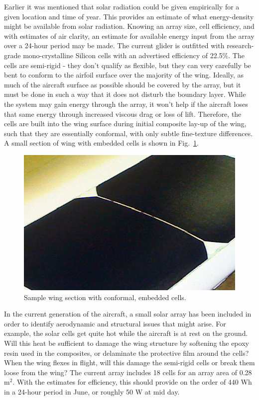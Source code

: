 \documentclass{ifacconf}
\begin{document}
Earlier it was mentioned that solar radiation could be given empirically for a given location and time of year. This provides an estimate of what energy-density might be available from solar radiation. Knowing an array size, cell efficiency, and with estimates of air clarity, an estimate for available energy input from the array over a 24-hour period may be made. The current glider is outfitted with research-grade mono-crystalline Silicon cells with an advertised efficiency of 22.5$\%$. The cells are semi-rigid - they don't qualify as flexible, but they can very carefully be bent to conform to the airfoil surface over the majority of the wing. Ideally, as much of the aircraft surface as possible should be covered by the array, but it must be done in such a way that it does not disturb the boundary layer. While the system may gain energy through the array, it won't help if the aircraft loses that same energy through increased viscous drag or loss of lift. Therefore, the cells are built into the wing surface during initial composite lay-up of the wing, such that they are essentially conformal, with only subtle fine-texture differences. A small section of wing with embedded cells is shown in Fig.~\ref{fig:wing_sample}.

\begin{figure}[thpb]
  \centering
  \includegraphics[scale=1.2]{Figures/IMG_3502.eps}
  \caption{Sample wing section with conformal, embedded cells.}
  \label{fig:wing_sample}
\end{figure}

In the current generation of the aircraft, a small solar array has been included in order to identify aerodynamic and structural issues that might arise. For example, the solar cells get quite hot while the aircraft is at rest on the ground. Will this heat be sufficient to damage the wing structure by softening the epoxy resin used in the composites, or delaminate the protective film around the cells? When the wing flexes in flight, will this damage the semi-rigid cells or break them loose from the wing? The current array includes 18 cells for an array area of 0.28 m$^2$. With the estimates for efficiency, this should provide on the order of 440 Wh in a 24-hour period in June, or roughly 50 W at mid day.
\end{document}
